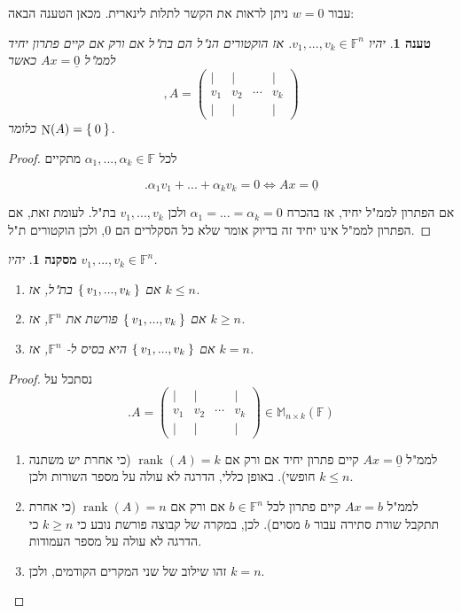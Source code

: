 \documentclass[12pt]{report}
\theoremstyle{plain}
\newtheorem{proposition}[theorem]{טענה}
\newtheorem{corollary}[theorem]{מסקנה}
\theoremstyle{definition}
\newcommand{\F}{\mathbb{F}}
\DeclareMathOperator{\rank}{rank}
\newcommand{\M}{\mathbb{M}}
\newcommand{\0}{\mathbf{0}}
\DeclareMathOperator{\Null}{N}
\begin{document}
עבור 
$w=0$
ניתן לראות את הקשר לתלות לינארית. מכאן הטענה הבאה:

\begin{proposition}\label{prop:nullity}
יהיו 
$v_1,...,v_k\in\F^n$.
אז הוקטורים הנ"ל הם בת"ל אם ורק אם קיים פתרון יחיד לממ"ל
$Ax=\underline{0}$
כאשר
$$
,A=\begin{pmatrix}
| & | & & | \\
v_1 & v_2 & \cdots & v_k \\
| & | & & |
\end{pmatrix}
$$
כלומר
$\Null(A)=\Set{0}$.
\end{proposition}

\begin{proof}
לכל
$\alpha_1,...,\alpha_k\in\F$
מתקיים

$$
.\alpha_1v_1+...+\alpha_kv_k=0 \iff Ax=\underline{0}
$$

אם הפתרון לממ"ל יחיד, אז בהכרח
$\alpha_1=...=\alpha_k=0$
ולכן
$v_1,...,v_k$
בת"ל.
לעומת זאת, אם הפתרון לממ"ל אינו יחיד זה בדיוק אומר שלא כל הסקלרים הם 
$0$,
ולכן הוקטורים ת"ל.
\end{proof}

\begin{corollary}\label{cor:size-dim}
יהיו 
$v_1,...,v_k\in\F^n$.
\begin{enumerate}[label=\alph*.]
\item 
אם 
$\Set{v_1,...,v_k}$
בת"ל, אז
$k\leq n$.


\item 
אם
$\Set{v_1,...,v_k}$
פורשת את
$\F^n$,
אז
$k\geq n$.


\item
אם
$\Set{v_1,...,v_k}$
היא בסיס ל-
$\F^n$,
אז
$k=n$.


\end{enumerate}
\end{corollary}

\begin{proof}
נסתכל על
$$
.A=\begin{pmatrix}
| & | & & | \\
v_1 & v_2 & \cdots & v_k \\
| & | & & |
\end{pmatrix}\in\M_{n\times k}(\F)
$$

\begin{enumerate}[label=\alph*.]
\item 
לממ"ל
$Ax=\underline{0}$
קיים פתרון יחיד אם ורק אם
$\rank(A)=k$
(כי אחרת יש משתנה חופשי).
באופן כללי, הדרגה לא עולה על מספר השורות ולכן
$k\leq n$.


\item 
לממ"ל
$Ax=b$
קיים פתרון לכל
$b\in\F^n$
אם ורק אם 
$\rank(A)=n$
(כי אחרת תתקבל שורת סתירה עבור 
$b$
מסוים).
לכן, במקרה של קבוצה פורשת נובע כי
$k\geq n$
כי הדרגה לא עולה על מספר העמודות.


\item 
זהו שילוב של שני המקרים הקודמים, ולכן 
$k=n$.


\end{enumerate}
\end{proof}
\end{document}
